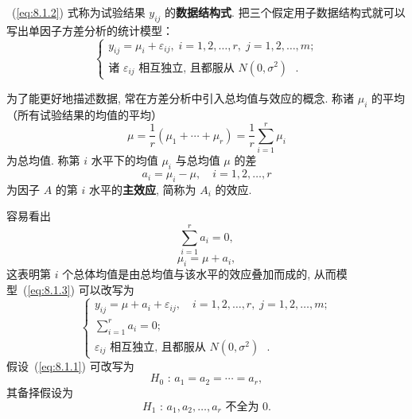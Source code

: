 ~(\ref{eq:8.1.2}) 式称为试验结果 $y_{ij}$ 的\textbf{数据结构式}. 把三个假定用子数据结构式就可以写出单因子方差分析的统计模型：
\begin{equation}
  \label{eq:8.1.3}
  \begin{cases}
    y_{ij}  = \mu_i + \varepsilon_{ij}, \; i = 1,2,\ldots,r,\; j = 1,2,\ldots,m; \\
    \text{诸 $\varepsilon_{ij}$ 相互独立, 且都服从 $N(0,\sigma^2)$ }.
  \end{cases}
\end{equation}

为了能更好地描述数据, 常在方差分析中引入总均值与效应的概念. 称诸 $\mu_i$ 的平均（所有试验结果的均值的平均）
\begin{equation}
  \label{eq.8.1.4}
  \mu = \frac{1}{r} (\mu_1 + \cdots + \mu_r) = \frac{1}{r} \sum_{i=1}^{r} \mu_i
\end{equation}
为总均值. 称第 $i$ 水平下的均值 $\mu_i$ 与总均值 $\mu$ 的差
\begin{equation}
  \label{eq:8.1.5}
  a_i = \mu_i - \mu, \quad i = 1,2,\ldots,r
\end{equation}
为因子 $A$ 的第 $i$ 水平的\textbf{主效应}, 简称为 $A_i$ 的效应. 

容易看出 
\begin{equation}
  \label{eq:8.1.6}
  \sum_{i=1}^{r} a_i = 0,
\end{equation}
\begin{equation}
  \label{eq:8.1.7}
  \mu_i = \mu + a_i,
\end{equation}
这表明第 $i$ 个总体均值是由总均值与该水平的效应叠加而成的, 从而模型~(\ref{eq:8.1.3}) 可以改写为
\begin{equation}
  \label{eq:8.1.8}
  \begin{cases}
    y_{ij}  = \mu + a_i + \varepsilon_{ij}, \quad i = 1,2,\ldots,r,\; j = 1,2,\ldots,m; \\
    \sum\limits_{i=1}^{r} a_i = 0; \\
    \text{$\varepsilon_{ij}$ 相互独立, 且都服从 $N(0,\sigma^2)$ }.
  \end{cases}
\end{equation}
假设~(\ref{eq:8.1.1}) 可改写为 
\begin{equation}
  H_0 \textrm{ : } a_1 = a_2 = \cdots = a_r,\label{eq:8.1.9}
\end{equation}
其备择假设为
\begin{equation*}
  H_1 \text{ : } a_1,a_2,\ldots,a_r \text{ 不全为 0.}
\end{equation*}

